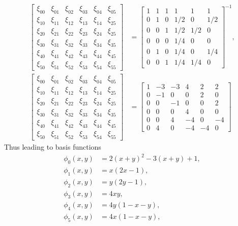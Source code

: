 \documentclass[12pt,a4paper]{article}
\begin{document}
\begin{align}
\left[ \begin{matrix}
\xi_{00} & \xi_{01} & \xi_{02} & \xi_{03} & \xi_{04} & \xi_{05}\\
\xi_{10} & \xi_{11} & \xi_{12} & \xi_{13} & \xi_{14} & \xi_{25}\\
\xi_{20} & \xi_{21} & \xi_{22} & \xi_{23} & \xi_{24} & \xi_{25}\\
\xi_{30} & \xi_{31} & \xi_{32} & \xi_{33} & \xi_{34} & \xi_{35}\\
\xi_{40} & \xi_{41} & \xi_{42} & \xi_{43} & \xi_{44} & \xi_{45}\\
\xi_{50} & \xi_{51} & \xi_{52} & \xi_{53} & \xi_{54} & \xi_{55}
\end{matrix} \right] &= 
\left[ \begin{matrix}
1 & 1 & 1 & 1 & 1 & 1\\
0 & 1 & 0 & 1/2 & 0 & 1/2\\
0 & 0 & 1 & 1/2 & 1/2 & 0\\
0 & 0 & 0 & 1/4 & 0 & 0\\
0 & 1 & 0 & 1/4 & 0 & 1/4\\
0 & 0 & 1 & 1/4 & 1/4 & 0
\end{matrix} \right]^{-1}, \\
\left[ \begin{matrix}
\xi_{00} & \xi_{01} & \xi_{02} & \xi_{03} & \xi_{04} & \xi_{05}\\
\xi_{10} & \xi_{11} & \xi_{12} & \xi_{13} & \xi_{14} & \xi_{25}\\
\xi_{20} & \xi_{21} & \xi_{22} & \xi_{23} & \xi_{24} & \xi_{25}\\
\xi_{30} & \xi_{31} & \xi_{32} & \xi_{33} & \xi_{34} & \xi_{35}\\
\xi_{40} & \xi_{41} & \xi_{42} & \xi_{43} & \xi_{44} & \xi_{45}\\
\xi_{50} & \xi_{51} & \xi_{52} & \xi_{53} & \xi_{54} & \xi_{55}
\end{matrix} \right] &= 
\left[ \begin{matrix}
1 & -3 & -3 & 4 & 2 & 2\\
0 & -1 & 0 & 0 & 2 & 0\\
0 & 0 & -1 & 0 & 0 & 2\\
0 & 0 & 0 & 4 & 0 & 0\\
0 & 0 & 4 & -4 & 0 & -4\\
0 & 4 & 0 & -4 & -4 & 0
\end{matrix} \right]
\end{align}
Thus leading to basis functions
\begin{align}
\phi_0(x,y) &= 2(x+y)^2 - 3(x+y) + 1, \\
\phi_1(x,y) &= x(2x-1), \\
\phi_2(x,y) &= y(2y-1), \\
\phi_3(x,y) &= 4xy, \\
\phi_4(x,y) &= 4y(1-x-y), \\
\phi_5(x,y) &= 4x(1-x-y),
\end{align}
\end{document}
